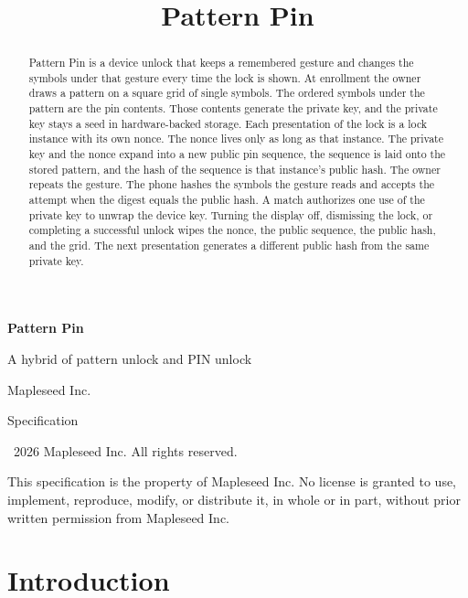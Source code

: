 \documentclass[11pt]{article}
\title{Pattern Pin}
\author{}
\date{}
\begin{document}
\begin{center}
{\LARGE\bfseries Pattern Pin\par}
\vspace{0.55em}
{\large A hybrid of pattern unlock and PIN unlock\par}
\vspace{0.75em}
{\large Mapleseed Inc.\par}
\vspace{0.45em}
Specification\par
\vspace{0.7em}
{\small\textcopyright\ 2026 Mapleseed Inc. All rights reserved.\par}
\vspace{0.45em}
\begin{minipage}{0.92\textwidth}
\small
This specification is the property of Mapleseed Inc.
No license is granted to use, implement, reproduce, modify, or distribute it, in whole or in part, without prior written permission from Mapleseed Inc.
\end{minipage}
\end{center}

\begin{abstract}
\noindent
Pattern Pin is a device unlock that keeps a remembered gesture and changes the symbols under that gesture every time the lock is shown.
At enrollment the owner draws a pattern on a square grid of single symbols.
The ordered symbols under the pattern are the pin contents.
Those contents generate the private key, and the private key stays a seed in hardware-backed storage.
Each presentation of the lock is a lock instance with its own nonce.
The nonce lives only as long as that instance.
The private key and the nonce expand into a new public pin sequence, the sequence is laid onto the stored pattern, and the hash of the sequence is that instance's public hash.
The owner repeats the gesture.
The phone hashes the symbols the gesture reads and accepts the attempt when the digest equals the public hash.
A match authorizes one use of the private key to unwrap the device key.
Turning the display off, dismissing the lock, or completing a successful unlock wipes the nonce, the public sequence, the public hash, and the grid.
The next presentation generates a different public hash from the same private key.
\end{abstract}

\tableofcontents

\section{Introduction}
\end{document}
